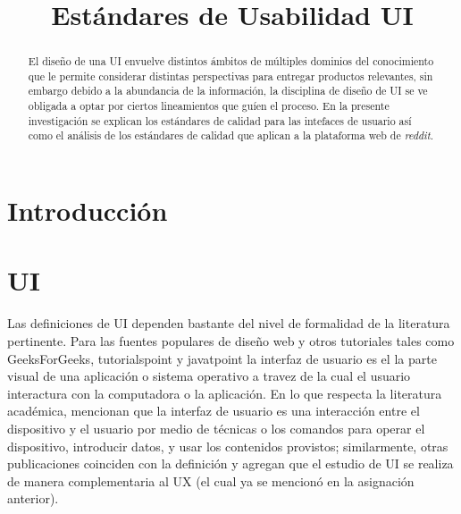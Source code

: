 \title{Estándares de Usabilidad UI}

\author{
}

\maketitle

\begin{abstract}
El diseño de una UI envuelve distintos ámbitos de múltiples dominios del conocimiento
que le permite considerar distintas perspectivas para entregar productos relevantes, sin embargo
debido a la abundancia de la información, la disciplina de diseño de UI se ve obligada a optar
por ciertos lineamientos que guíen el proceso. En la presente investigación se explican 
los estándares de calidad para las intefaces de usuario así como el análisis de los 
estándares de calidad que aplican a la plataforma web de \emph{reddit}.
\end{abstract}

\section{Introducción}

\section{UI}
Las definiciones de UI dependen bastante del nivel de formalidad de la literatura
pertinente. Para las fuentes populares de diseño web y otros tutoriales tales como GeeksForGeeks, tutorialspoint y javatpoint \cite{tutorialspoint-2021,geeksforgeeks-2022,unknown-author-no-dateA} %
la interfaz de usuario es el la parte visual de una aplicación o sistema operativo a travez de la cual
el usuario interactura con la computadora o la aplicación. En lo que respecta la literatura
académica, \cite{sharma-2021} %
mencionan que la interfaz de usuario es una interacción entre
el dispositivo y el usuario por medio de técnicas o los comandos para operar el dispositivo,
introducir datos, y usar los contenidos provistos; similarmente, otras publicaciones
coinciden con la definición y agregan que el estudio de UI se realiza de manera complementaria al UX \cite{joo-2017,guntupalli-no-date}%
(el cual ya se mencionó en la asignación anterior).
\\

